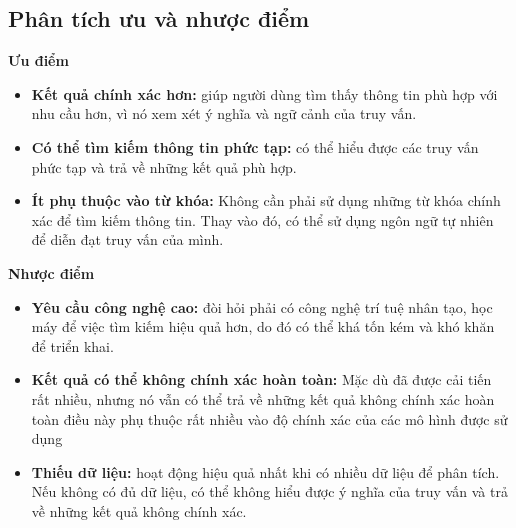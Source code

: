 \subsection{Phân tích ưu và nhược điểm}
\textbf{Ưu điểm}
\begin{itemize}
    \item \textbf{Kết quả chính xác hơn:} giúp người dùng tìm thấy thông tin phù hợp với nhu cầu hơn, vì nó xem xét ý nghĩa và ngữ cảnh của truy vấn.
    \item \textbf{Có thể tìm kiếm thông tin phức tạp:} có thể hiểu được các truy vấn phức tạp và trả về những kết quả phù hợp.
    \item \textbf{Ít phụ thuộc vào từ khóa:} Không cần phải sử dụng những từ khóa chính xác để tìm kiếm thông tin. Thay vào đó, có thể sử dụng ngôn ngữ tự nhiên để diễn đạt truy vấn của mình.
\end{itemize}
\textbf{Nhược điểm}
\begin{itemize}
    \item \textbf{Yêu cầu công nghệ cao:} đòi hỏi phải có công nghệ trí tuệ nhân tạo, học máy để việc tìm kiếm hiệu quả hơn, do đó có thể khá tốn kém và khó khăn để triển khai.
    \item \textbf{Kết quả có thể không chính xác hoàn toàn:} Mặc dù đã được cải tiến rất nhiều, nhưng nó vẫn có thể trả về những kết quả không chính xác hoàn toàn điều này phụ thuộc rất nhiều vào độ chính xác của các mô hình được sử dụng
    \item \textbf{Thiếu dữ liệu:} hoạt động hiệu quả nhất khi có nhiều dữ liệu để phân tích. Nếu không có đủ dữ liệu, có thể không hiểu được ý nghĩa của truy vấn và trả về những kết quả không chính xác.
\end{itemize}